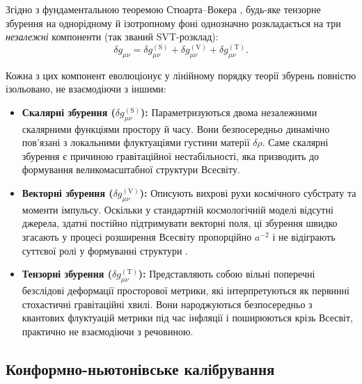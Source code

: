 \documentclass[12pt, a4paper]{article}
\begin{document}
Згідно з фундаментальною теоремою Стюарта--Вокера \cite{stewart_walker_1974}, будь-яке тензорне збурення на однорідному й ізотропному фоні однозначно розкладається на три \emph{незалежні} компоненти (так званий SVT-розклад):
\begin{equation}\label{eq:svt_decomposition}
  \delta g_{\mu\nu} = \delta g_{\mu\nu}^{(\mathrm{S})} + \delta g_{\mu\nu}^{(\mathrm{V})} + \delta g_{\mu\nu}^{(\mathrm{T})}.
\end{equation}

Кожна з цих компонент еволюціонує у лінійному порядку теорії збурень повністю ізольовано, не взаємодіючи з іншими:
\begin{itemize}
  \item \textbf{Скалярні збурення ($\delta g_{\mu\nu}^{(\mathrm{S})}$):} Параметризуються двома незалежними скалярними функціями простору й часу. Вони безпосередньо динамічно пов'язані з локальними флуктуаціями густини матерії $\delta\rho$. Саме скалярні збурення є причиною гравітаційної нестабільності, яка призводить до формування великомасштабної структури Всесвіту.
  \item \textbf{Векторні збурення ($\delta g_{\mu\nu}^{(\mathrm{V})}$):} Описують вихрові рухи космічного субстрату та моменти імпульсу. Оскільки у стандартній космологічній моделі відсутні джерела, здатні постійно підтримувати векторні поля, ці збурення швидко згасають у процесі розширення Всесвіту пропорційно $a^{-2}$ і не відіграють суттєвої ролі у формуванні структури \cite{mukhanov_2005}.
  \item \textbf{Тензорні збурення ($\delta g_{\mu\nu}^{(\mathrm{T})}$):} Представляють собою вільні поперечні безслідові деформації просторової метрики, які інтерпретуються як первинні стохастичні гравітаційні хвилі. Вони народжуються безпосередньо з квантових флуктуацій метрики під час інфляції і поширюються крізь Всесвіт, практично не взаємодіючи з речовиною.
\end{itemize}

\subsection{Конформно-ньютонівське калібрування}
\end{document}
